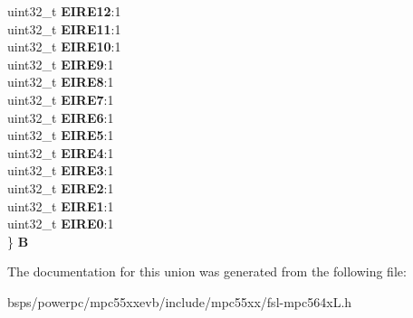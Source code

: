 \begin{DoxyCompactItemize}
\begin{tabbing}
\>uint32\_t {\bfseries EIRE12}:1\\
\>uint32\_t {\bfseries EIRE11}:1\\
\>uint32\_t {\bfseries EIRE10}:1\\
\>uint32\_t {\bfseries EIRE9}:1\\
\>uint32\_t {\bfseries EIRE8}:1\\
\>uint32\_t {\bfseries EIRE7}:1\\
\>uint32\_t {\bfseries EIRE6}:1\\
\>uint32\_t {\bfseries EIRE5}:1\\
\>uint32\_t {\bfseries EIRE4}:1\\
\>uint32\_t {\bfseries EIRE3}:1\\
\>uint32\_t {\bfseries EIRE2}:1\\
\>uint32\_t {\bfseries EIRE1}:1\\
\>uint32\_t {\bfseries EIRE0}:1\\
\} {\bfseries B}\\

\end{tabbing}\end{DoxyCompactItemize}


The documentation for this union was generated from the following file\+:\begin{DoxyCompactItemize}
\item 
bsps/powerpc/mpc55xxevb/include/mpc55xx/fsl-\/mpc564x\+L.\+h\end{DoxyCompactItemize}
